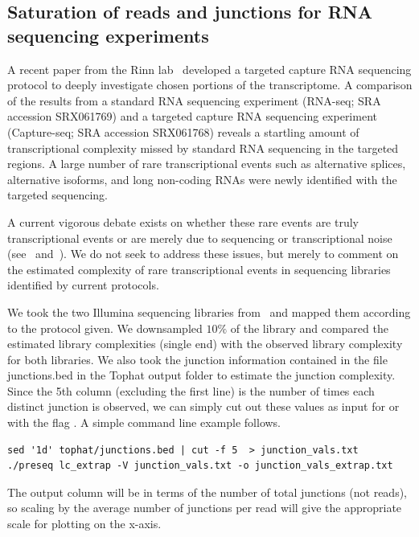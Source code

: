 \documentclass[11pt, titlepage]{article}
\begin{document}
\newpage


\subsection*{Saturation of reads and junctions for RNA sequencing experiments}

A recent paper from the Rinn lab~\cite{mercer2011targeted}
developed a targeted capture RNA sequencing
protocol to deeply investigate chosen portions of the transcriptome.  
A comparison of the results from a standard RNA sequencing
experiment (RNA-seq; SRA accession SRX061769) and a targeted capture RNA sequencing
experiment (Capture-seq; SRA accession SRX061768) reveals
a startling amount of transcriptional complexity missed by standard
RNA sequencing in the targeted regions.  A large number of
rare transcriptional events such as alternative splices, alternative isoforms,
and long non-coding RNAs were newly identified with the targeted sequencing.

A current vigorous debate exists on whether these rare events are truly transcriptional
events or are merely due to sequencing or transcriptional noise 
(see~\cite{van2010most} and~\cite{clark2011reality}).  We do not seek to address
these issues, but merely to comment on the estimated complexity
of rare transcriptional events in sequencing libraries identified by current
protocols.

We took the two Illumina sequencing libraries from~\cite{mercer2011targeted} and
mapped them according to the protocol given.  We downsampled $10 \%$ of the library
and compared the estimated library complexities (single end) with the observed library
complexity for both libraries.  We also took the junction information contained in the file
junctions.bed in the Tophat output folder to estimate the junction complexity.  Since
the 5th column (excluding the first line) is the number of times each
distinct junction is observed, we can simply cut out these values as input for
 or  with the flag .  A simple command line example follows.

\begin{verbatim}
sed '1d' tophat/junctions.bed | cut -f 5  > junction_vals.txt
./preseq lc_extrap -V junction_vals.txt -o junction_vals_extrap.txt 
\end{verbatim}

The output  column will be in terms of the number of 
total junctions (not reads), so scaling by the average number of junctions per 
read will give the appropriate scale for plotting on the x-axis.  
\end{document}
